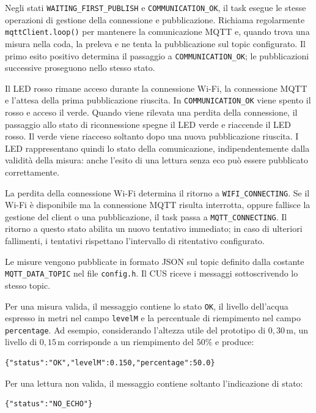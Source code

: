 Negli stati \texttt{WAITING\_FIRST\_PUBLISH} e
\texttt{COMMUNICATION\_OK}, il task esegue le stesse operazioni
di gestione della connessione e pubblicazione.
Richiama regolarmente \texttt{mqttClient.loop()} per mantenere
la comunicazione MQTT e, quando trova una misura nella coda,
la preleva e ne tenta la pubblicazione sul topic configurato.
Il primo esito positivo determina il passaggio a
\texttt{COMMUNICATION\_OK}; le pubblicazioni successive
proseguono nello stesso stato.

Il LED rosso rimane acceso durante la connessione Wi-Fi,
la connessione MQTT e l'attesa della prima pubblicazione riuscita.
In \texttt{COMMUNICATION\_OK} viene spento il rosso e acceso
il verde.
Quando viene rilevata una perdita della connessione,
il passaggio allo stato di riconnessione spegne il LED verde
e riaccende il LED rosso.
Il verde viene riacceso soltanto dopo una nuova pubblicazione
riuscita.
I LED rappresentano quindi lo stato della comunicazione,
indipendentemente dalla validità della misura: anche l'esito
di una lettura senza eco può essere pubblicato correttamente.

La perdita della connessione Wi-Fi determina il ritorno a
\texttt{WIFI\_CONNECTING}.
Se il Wi-Fi è disponibile ma la connessione MQTT risulta
interrotta, oppure fallisce la gestione del client o una
pubblicazione, il task passa a \texttt{MQTT\_CONNECTING}.
Il ritorno a questo stato abilita un nuovo tentativo immediato;
in caso di ulteriori fallimenti, i tentativi rispettano
l'intervallo di ritentativo configurato.

Le misure vengono pubblicate in formato JSON sul topic
definito dalla costante \texttt{MQTT\_DATA\_TOPIC}
nel file \texttt{config.h}.
Il CUS riceve i messaggi sottoscrivendo lo stesso topic.

Per una misura valida, il messaggio contiene lo stato
\texttt{OK}, il livello dell'acqua espresso in metri
nel campo \texttt{levelM} e la percentuale di riempimento
nel campo \texttt{percentage}.
Ad esempio, considerando l'altezza utile del prototipo
di \(0{,}30\,\mathrm{m}\), un livello di
\(0{,}15\,\mathrm{m}\) corrisponde a un riempimento
del \(50\%\) e produce:

\begin{verbatim}
{"status":"OK","levelM":0.150,"percentage":50.0}
\end{verbatim}

Per una lettura non valida, il messaggio contiene
soltanto l'indicazione di stato:

\begin{verbatim}
{"status":"NO_ECHO"}
\end{verbatim}

